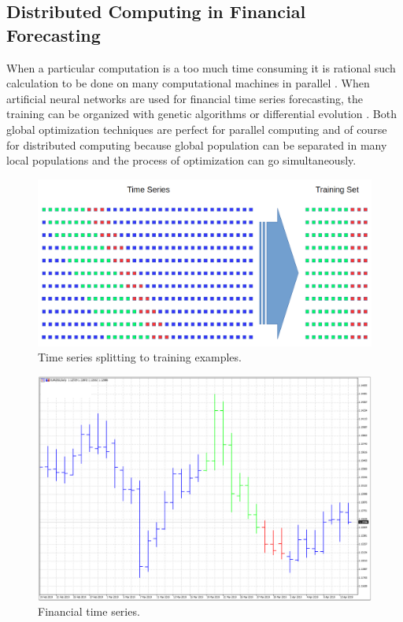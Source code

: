 \documentclass[runningheads]{llncs}
\begin{document}
\subsection{Distributed Computing in Financial Forecasting}
%
When a particular computation is a too much time consuming it is rational such calculation to be done on many computational machines in parallel \cite{distributed-computing-01}. When artificial neural networks are used for financial time series forecasting, the training can be organized with genetic algorithms \cite{genetic-algorithms-01} or differential evolution \cite{differential-evolution-01}. Both global optimization techniques are perfect for parallel computing and of course for distributed computing because global population can be separated in many local populations and the process of optimization can go simultaneously.

\begin{figure}
\includegraphics[width=\textwidth]{fig01.png}
\caption{Time series splitting to training examples.}
\label{fig01}
\end{figure}

\begin{figure}
\includegraphics[width=\textwidth]{fig02.png}
\caption{Financial time series.}
\label{fig02}
\end{figure}
\end{document}
